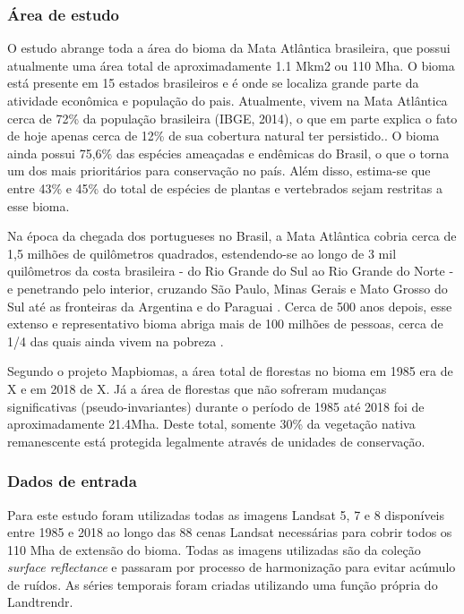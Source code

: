 \documentclass[12pt,a4paper]{article}
\begin{document}
\subsubsection{Área de estudo}
\hspace{13pt} O estudo abrange toda a área do bioma da Mata Atlântica brasileira, que possui atualmente uma área total de aproximadamente 1.1 Mkm2 ou 110 Mha. O bioma está presente em 15 estados brasileiros e é onde se localiza grande parte da atividade econômica e população do pais. Atualmente, vivem na Mata Atlântica cerca de 72\% da população brasileira (IBGE, 2014), o que em parte explica o fato de hoje apenas cerca de 12\% de sua cobertura natural ter persistido.. O bioma ainda possui 75,6\% das espécies ameaçadas e endêmicas do Brasil, o que o torna um dos mais prioritários para conservação no país. Além disso, estima-se que entre 43\% e 45\% do total de espécies de plantas e vertebrados sejam restritas a esse bioma.

Na época da chegada dos portugueses no Brasil, a Mata Atlântica cobria cerca de 1,5 milhões de quilômetros quadrados, estendendo-se ao longo de 3 mil quilômetros da costa brasileira - do Rio Grande do Sul ao Rio Grande do Norte - e penetrando pelo interior, cruzando São Paulo, Minas Gerais e Mato Grosso do Sul até as fronteiras da Argentina e do Paraguai \citep{scarano2014}. Cerca de 500 anos depois, esse extenso e representativo bioma abriga mais de 100 milhões de pessoas, cerca de 1/4 das quais ainda vivem na pobreza \citep{scarano2014}.

Segundo o projeto Mapbiomas, a área total de florestas no bioma em 1985 era de X e em 2018 de X. Já a área de florestas que não sofreram mudanças significativas (pseudo-invariantes) durante o período de 1985 até 2018 foi de aproximadamente 21.4Mha. Deste total, somente  30\% da vegetação nativa remanescente está protegida legalmente através de unidades de conservação.


\subsubsection{Dados de entrada}
\hspace{13pt} Para este estudo foram utilizadas todas as imagens Landsat 5, 7 e 8 disponíveis entre 1985 e 2018 ao longo das 88 cenas Landsat necessárias para cobrir todos os 110 Mha de extensão do bioma. Todas as imagens utilizadas são da coleção \emph{surface reflectance} e passaram por processo de harmonização para evitar acúmulo de ruídos. As séries temporais foram criadas utilizando uma função própria do Landtrendr.
\end{document}

